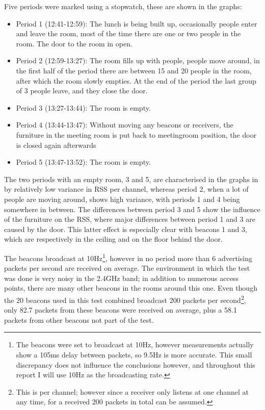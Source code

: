 Five periods were marked using a stopwatch, these are shown in the graphs:
\begin{itemize}
    \item Period 1 (12:41-12:59): The lunch is being built up, occasionally people enter and leave the room, most of the time there are one or two people in the room.
        The door to the room in open.
    \item Period 2 (12:59-13:27): The room fills up with people, people move around, in the first half of the period there are between 15 and 20 people in the room, after which the room slowly empties.
        At the end of the period the last group of 3 people leave, and they close the door.
    \item Period 3 (13:27-13:44): The room is empty.
    \item Period 4 (13:44-13:47): Without moving any beacons or receivers, the furniture in the meeting room is put back to meetingroom position, the door is closed again afterwards
    \item Period 5 (13:47-13:52): The room is empty.
\end{itemize}

The two periods with an empty room, 3 and 5, are characterised in the graphs in  by relatively low variance in RSS per channel, whereas period 2, when a lot of people are moving around, shows high variance, with periods 1 and 4 being somewhere in between.
The differences between period 3 and 5 show the influence of the furniture on the RSS, where major differences between period 1 and 3 are caused by the door.
This latter effect is especially clear with beacons 1 and 3, which are respectively in the ceiling and on the floor behind the door.

The beacons broadcast at 10Hz\footnote{The beacons were set to broadcast at 10Hz, however measurements actually show a 105ms delay between packets, so 9.5Hz is more accurate. This small discrepancy does not influence the conclusions however, and throughout this report I will use 10Hz as the broadcasting rate.}, however in no period more than 6 advertising packets per second are received on average.
The environment in which the test was done is very noisy in the 2.4GHz band; in addition to numerous \wifi access points, there are many other beacons in the rooms around this one. 
Even though the 20 beacons used in this test combined broadcast 200 packets per second\footnote{This is per channel; however since a receiver only listens at one channel at any time, for a received 200 packets in total can be assumed.}, only 82.7 packets from these beacons were received on average, plus a 58.1 packets from other beacons not part of the test.

